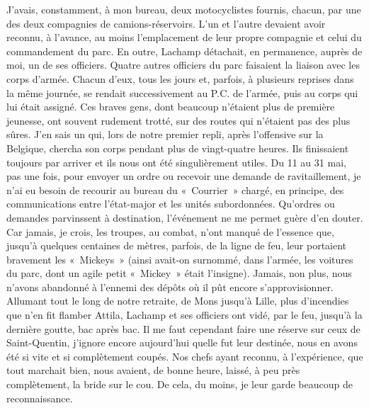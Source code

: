 \documentclass[french,twoside]{book} %
\begin{document}
J’avais, constamment, à mon bureau, deux motocyclistes fournis, chacun, par une des deux compagnies de camions-réservoirs. L’un et l’autre devaient avoir reconnu, à l’avance, au moins l’emplacement de leur propre compagnie et celui du commandement du parc. En outre, Lachamp détachait, en permanence, auprès de moi, un de ses officiers. Quatre autres officiers du parc faisaient la liaison avec les corps d’armée. Chacun d’eux, tous les jours et, parfois, à plusieurs reprises dans la même journée, se rendait successivement au P.C. de l’armée, puis au corps qui lui était assigné. Ces braves gens, dont beaucoup n’étaient plus de première jeunesse, ont souvent rudement trotté, sur des routes qui n’étaient pas des   plus sûres. J’en sais un qui, lors de notre premier repli, après l’offensive sur la Belgique, chercha son corps pendant plus de vingt-quatre heures. Ils finissaient toujours par arriver et ils nous ont été singulièrement utiles. Du 11 au 31 mai, pas une fois, pour envoyer un ordre ou recevoir une demande de ravitaillement, je n’ai eu besoin de recourir au bureau du « Courrier » chargé, en principe, des communications entre l’état-major et les unités subordonnées. Qu’ordres ou demandes parvinssent à destination, l’événement ne me permet guère d’en douter. Car jamais, je crois, les troupes, au combat, n’ont manqué de l’essence que, jusqu’à quelques centaines de mètres, parfois, de la ligne de feu, leur portaient bravement les « Mickeys » (ainsi avait-on surnommé, dans l’armée, les voitures du parc, dont un agile petit « Mickey » était l’insigne). Jamais, non plus, nous n’avons abandonné à l’ennemi des dépôts où il pût encore s’approvisionner. Allumant tout le long de notre retraite, de Mons jusqu’à Lille, plus d’incendies que n’en fit flamber Attila, Lachamp et ses officiers ont vidé, par le feu, jusqu’à la dernière goutte, bac après bac. Il me faut cependant faire une réserve sur ceux de Saint-Quentin, j’ignore encore aujourd’hui quelle fut leur destinée, nous en avons été si vite et si complètement coupés. Nos chefs ayant reconnu, à l’expérience, que tout marchait bien, nous avaient, de bonne heure, laissé, à peu près complètement, la bride sur le cou. De cela, du moins, je leur garde beaucoup de reconnaissance.\par
\end{document}
